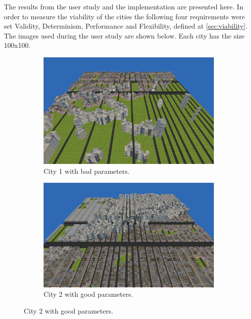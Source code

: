The results from the user study and the implementation are presented here. In order to measure the viability of the cities the following four requirements were set Validity, Determinism, Performance and Flexibility, defined at \ref{sec:viability}. The images used during the user study are shown below. Each city has the size 100x100.

\begin{figure}[h]
	\centering
	\begin{subfigure}{0.4\textwidth}
		\centering
		\includegraphics[width=0.9\linewidth]{"Images/bad parameters"}
		\caption*{City 1 with bad parameters.}
		\label{fig:bad-parameters}
	\end{subfigure}
	\begin{subfigure}{0.4\textwidth}
		\centering
		\includegraphics[width=0.9\linewidth]{"Images/good parameters 02"}
		\caption*{City 2 with good parameters.}
		\label{fig:good-parameters-02}
	\end{subfigure}
	\label{fig:city12}
\end{figure}

